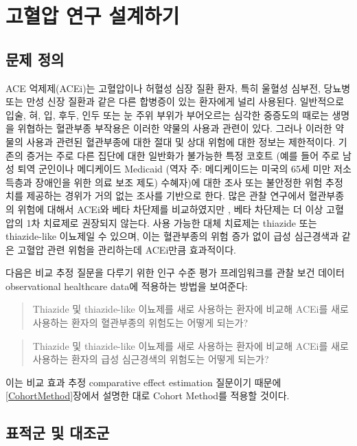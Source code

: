 \documentclass[10.5pt]{book}
\theoremstyle{definition}
\theoremstyle{definition}
\theoremstyle{definition}
\theoremstyle{remark}
\begin{document}
\section{고혈압 연구 설계하기}\label{--}

\subsection{문제 정의}\label{--1}

ACE 억제제(ACEi)는 고혈압이나 허혈성 심장 질환 환자, 특히 울혈성 심부전,
당뇨병 또는 만성 신장 질환과 같은 다른 합병증이 있는 환자에게 널리
사용된다. \citep{zaman_2002} 일반적으로 입술, 혀, 입, 후두, 인두 또는 눈
주위 부위가 부어오르는 심각한 중증도의 때로는 생명을 위협하는 혈관부종
부작용은 이러한 약물의 사용과 관련이 있다. \citep{sabroe_1997} 그러나
이러한 약물의 사용과 관련된 혈관부종에 대한 절대 및 상대 위험에 대한
정보는 제한적이다. 기존의 증거는 주로 다른 집단에 대한 일반화가 불가능한
특정 코호트 (예를 들어 주로 남성 퇴역 군인이나 메디케이드 Medicaid (역자
주: 메디케이드는 미국의 65세 미만 저소득층과 장애인을 위한 의료 보조
제도) 수혜자)에 대한 조사 또는 불안정한 위험 추정치를 제공하는 경위가
거의 없는 조사를 기반으로 한다. \citep{powers_2012} 많은 관찰 연구에서
혈관부종의 위험에 대해서 ACEi와 베타 차단제를 비교하였지만
\citep{magid_2010, toh_2012}, 베타 차단제는 더 이상 고혈압의 1차
치료제로 권장되지 않는다. \citep{whelton_2018} 사용 가능한 대체 치료제는
thiazide 또는 thiazide-like 이뇨제일 수 있으며, 이는 혈관부종의 위험
증가 없이 급성 심근경색과 같은 고혈압 관련 위험을 관리하는데 ACEi만큼
효과적이다.

다음은 비교 추정 질문을 다루기 위한 인구 수준 평가 프레임워크를 관찰
보건 데이터 observational healthcare data에 적용하는 방법을 보여준다:

\begin{quote}
Thiazide 및 thiazide-like 이뇨제를 새로 사용하는 환자에 비교해 ACEi를
새로 사용하는 환자의 혈관부종의 위험도는 어떻게 되는가?
\end{quote}

\begin{quote}
Thiazide 및 thiazide-like 이뇨제를 새로 사용하는 환자에 비교해 ACEi를
새로 사용하는 환자의 급성 심근경색의 위험도는 어떻게 되는가?
\end{quote}

이는 비교 효과 추정 comparative effect estimation 질문이기 때문에
\ref{CohortMethod}장에서 설명한 대로 Cohort Method를 적용할 것이다.

\subsection{표적군 및 대조군}\label{--}
\end{document}
